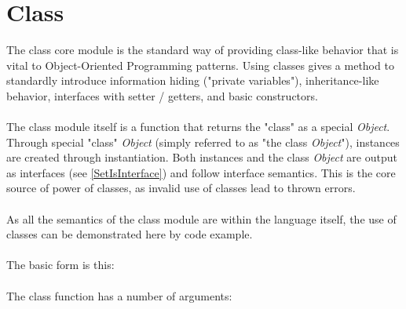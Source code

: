 \documentclass[12pt,letterpaper]{report}
\begin{document}
\section{Class}\label{Class}

The class core module is the standard way of providing class-like behavior 
that is vital to Object-Oriented Programming patterns. Using classes gives a method 
to standardly introduce information hiding ("private variables"), inheritance-like behavior, 
interfaces with setter / getters, and basic constructors.
\\\\
The class module itself is a function that returns the "class" as a special \textit{Object}.
Through special "class" \textit{Object} (simply referred to as "the class \textit{Object}"), instances are created through instantiation.
Both instances and the class \textit{Object} are output as interfaces (see \autoref{SetIsInterface})
and follow interface semantics. This is the core source of power of classes, as invalid use 
of classes lead to thrown errors.
\\\\
As all the semantics of the class module are within the language itself,
the use of classes can be demonstrated here by code example.
\\\\
The basic form is this:
\\\\


The class function has a number of arguments:
\end{document}
